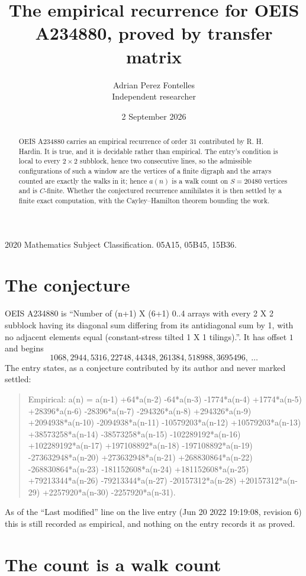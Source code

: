 \documentclass[11pt,a4paper]{article}
\title{The empirical recurrence for OEIS A234880, proved by transfer matrix}
\author{Adrian Perez Fontelles\\ \small Independent researcher}
\date{2 September 2026}
\theoremstyle{plain}
\theoremstyle{definition}
\begin{document}
\maketitle

\begin{abstract}
OEIS A234880 carries an empirical recurrence of order $31$ contributed by R. H. Hardin. It is
true, and it is decidable rather than empirical. The entry's condition is local to every $2\times2$ subblock, hence two consecutive lines, so
the admissible configurations of such a window are the vertices of a finite digraph and the
arrays counted are exactly the walks in it; hence $a(n)$ is a walk count on $S=20480$ vertices
and is $C$-finite. Whether the conjectured recurrence annihilates it is then settled by a
finite exact computation, with the Cayley--Hamilton theorem bounding the work.
\end{abstract}

\noindent\small 2020 Mathematics Subject Classification. 05A15, 05B45, 15B36.\normalsize

\section{The conjecture}

OEIS A234880 is ``Number of (n+1) X (6+1) 0..4 arrays with every 2 X 2 subblock having its diagonal sum differing from its antidiagonal sum by 1, with no adjacent elements equal (constant-stress tilted 1 X 1 tilings).''. It has offset $1$ and begins
\[
1068, 2944, 5316, 22748, 44348, 261384, 518988, 3695496,\ \dots
\]
The entry states, as a conjecture contributed by its author and never marked settled:
\begin{quote}
Empirical: a(n) = a(n-1) +64*a(n-2) -64*a(n-3) -1774*a(n-4) +1774*a(n-5) +28396*a(n-6) -28396*a(n-7) -294326*a(n-8) +294326*a(n-9) +2094938*a(n-10) -2094938*a(n-11) -10579203*a(n-12) +10579203*a(n-13) +38573258*a(n-14) -38573258*a(n-15) -102289192*a(n-16) +102289192*a(n-17) +197108892*a(n-18) -197108892*a(n-19) -273632948*a(n-20) +273632948*a(n-21) +268830864*a(n-22) -268830864*a(n-23) -181152608*a(n-24) +181152608*a(n-25) +79213344*a(n-26) -79213344*a(n-27) -20157312*a(n-28) +20157312*a(n-29) +2257920*a(n-30) -2257920*a(n-31).
\end{quote}
As of the ``Last modified'' line on the live entry (Jun 20 2022 19:19:08, revision 6) this is still
recorded as empirical, and nothing on the entry records it as proved.

\section{The count is a walk count}
\end{document}
